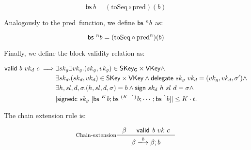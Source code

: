 \documentclass[11pt,a4paper]{article}
\newcommand{\var}[1]{\mathit{#1}}
\newcommand{\fun}[1]{\mathsf{#1}}
\newcommand{\type}[1]{\mathsf{#1}}
\newcommand{\trans}[2]{\xlongrightarrow[\textsc{#1}]{#2}}
\newcommand{\SKey}{\type{SKey}}
\newcommand{\SKeyGen}{\type{SKey_G}}
\newcommand{\VKey}{\type{VKey}}
\newcommand{\signname}{sign}
\newcommand{\signedseqname}{signedc}
\newcommand{\delegatename}{delegate}
\newcommand{\validname}{valid}
\newcommand{\predbname}{pred} %
\newcommand{\toseqname}{toSeq} %
\newcommand{\predbseqname}{bs} %
\newcommand{\sign}[4]{\fun{\signname}\ #1 ~ #2 ~ #3 ~ #4}
\newcommand{\signedwindow}[2]{\fun{\signedseqname}\ #1 ~ #2}
\newcommand{\delegate}[2]{\fun{\delegatename}\ #1 ~ #2}
\newcommand{\valid}[3]{\fun{\validname} ~ #1 ~ #2 ~ #3}
\newcommand{\predbseq}[1]{\fun{\predbseqname} ~ #1}
\begin{document}
\begin{equation}
  \label{eq:predbseq}
  \predbseq{b} = (\text{\toseqname} \circ \text{\predbname})(b)
\end{equation}

Analogously to the \predbname\ function, we define $\predbseq^n{b}$ as:

\begin{equation}
  \label{eq:predbseqton}
  \predbseq^n{b} = (\text{\toseqname} \circ \text{\predbname}^n)(b)
\end{equation}

Finally, we define the block validity relation as:

\begin{align}
  \label{eq:valid-block}
    \valid{b}{vk_d}{c} \implies &
      \exists sk_g \exists vk_g. (sk_g, vk_g) \in \SKeyGen \times \VKey \wedge \\
      & \exists sk_d. (sk_d, vk_d) \in \SKey \times \VKey \wedge
      \delegate{sk_g}{vk_d} = (vk_g, vk_d, \sigma') \wedge \\
      & \exists h, sl, d, \sigma. (h, sl, d, \sigma) = b \wedge
        \sign{sk_d}{h}{sl}{d} = \sigma \wedge \\
      & | \signedwindow{sk_g}{[\predbseq^K\var{b}; \predbseq^{(K-1)}\var{b}; \cdots; \predbseq^1{b}]} | \leq K \cdot t.
\end{align}

The chain extension rule is:

\begin{equation}
  \label{eq:chain-extension}
  \inference[Chain-extension]
  {\beta & \valid{\var{b}}{vk}{c}
  }
  {\beta \trans{}{\var{b}} {\beta; b}}
\end{equation}
\end{document}
